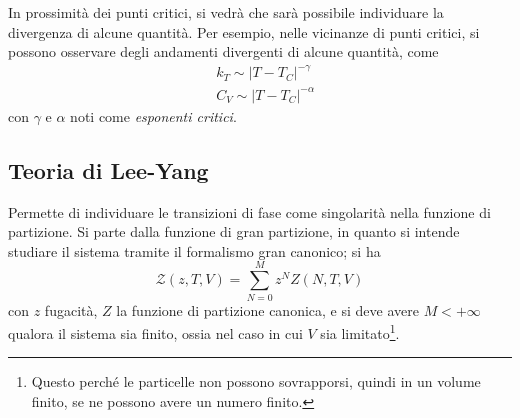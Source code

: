 \documentclass[11pt, a4paper]{scrartcl}
\theoremstyle{style}
\theoremstyle{style1}
\numberwithin{equation}{subsection}
\begin{document}
		In prossimit\`a dei punti critici, si vedr\`a che sar\`a possibile individuare la divergenza di alcune quantit\`a. 
		Per esempio, nelle vicinanze di punti critici, si possono osservare degli andamenti divergenti di alcune quantit\`a, come
		\[
		\begin{split}
			&k_T \sim \lvert T-T_C \rvert ^{-\gamma} \\
			& C_V \sim \lvert T-T_C \rvert ^{-\alpha }
		\end{split}
		\] 
	con $\gamma$ e $\alpha $ noti come \textit{esponenti critici}.
\subsection{Teoria di Lee-Yang}
Permette di individuare le transizioni di fase come singolarit\`a nella funzione di partizione.
Si parte dalla funzione di gran partizione, in quanto si intende studiare il sistema tramite il formalismo gran canonico; si ha 
\[
\mathcal{Z} (z,T,V) = \sum_{N=0}^{M} z^N Z(N,T,V)
\] 
con $z$ fugacit\`a, $Z$ la funzione di partizione canonica, e si deve avere $M<+\infty$ qualora il sistema sia finito, ossia nel caso in cui $V$ sia limitato\footnote{Questo perch\'e le particelle non possono sovrapporsi, quindi in un volume finito, se ne possono avere un numero finito.}.
\end{document}
